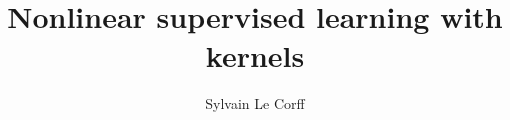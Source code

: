 \documentclass[xcolor={usenames,dvipsnames}]{beamer}
\begin{document}
\title[]{Nonlinear supervised learning with kernels}
\author[S.~Le Corff]{Sylvain Le Corff}
\date{}

\begin{frame}[plain]
\titlepage
\end{frame}

%
%






%
%
%
%
%
\end{document}
